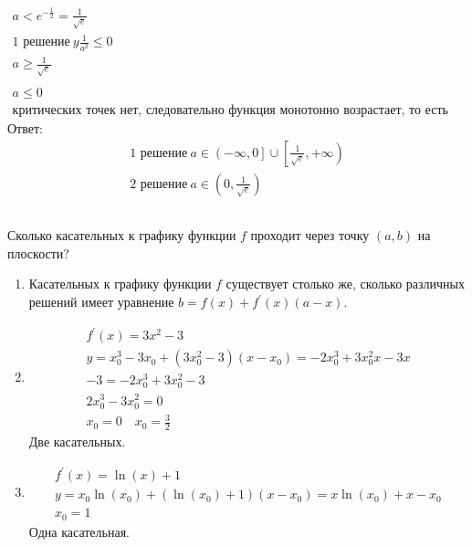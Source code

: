 \begin{enumerate}
\begin{gather*}
				a < e^{-\frac{1}{2}} = \frac{1}{\sqrt{e}}\\
				\text{1 решение}\ y \frac{1}{a^{2}} \leqslant 0\\
				a \geqslant \frac{1}{\sqrt{e}}\\
				\\
				a \leqslant 0\\
				\text{критических точек нет, следовательно функция монотонно возрастает, то есть есть ровно одно решение}
			\end{gather*}
			Ответ:
			\begin{gather*}
				\text{1 решение}\ a \in \left(-\infty, 0\right] \cup \left[\frac{1}{\sqrt{e}}, +\infty \right)\\
				\text{2 решение}\ a \in \left(0, \frac{1}{\sqrt{e}} \right)
			\end{gather*} 
		\end{enumerate}
		

		\subsection{}
		Сколько касательных к графику функции $f$ проходит через точку $(a,b)$ на плоскости? 
		\begin{enumerate}
		\item 
			Касательных к графику функции $f$ существует столько же, сколько различных решений имеет уравнение $b = f(x) + f^{\prime}(x)(a - x)$.
				
		\item
			\begin{gather*}
				f^{\prime}(x) = 3x^2 - 3\\
				y = x_0^3 - 3x_0 + (3x_0^2 - 3)(x - x_0) = - 2x_0^3 + 3x_0^2x - 3x\\
				 - 3 = - 2x_0^3 + 3x_0^2 - 3\\
				2x_0^3 - 3x_0^2 = 0\\
				x_0 = 0\quad x_0 = \frac{3}{2}
			\end{gather*}
			Две касательных. 
			
		\item
			\begin{gather*}
				f^{\prime}(x) = \ln(x) + 1\\
				y = x_0\ln(x_0) + (\ln(x_0) + 1)(x - x_0) = x\ln(x_0) + x - x_0\\
				x_0 = 1
			\end{gather*}
			Одна касательная.
		\end{enumerate}
		
